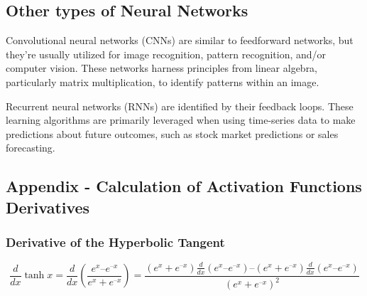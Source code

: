\documentclass[11pt]{article}
\begin{document}
    \hypertarget{other-types-of-neural-networks}{%
\subsection{Other types of Neural
Networks}\label{other-types-of-neural-networks}}

    Convolutional neural networks (CNNs) are similar to feedforward
networks, but they're usually utilized for image recognition, pattern
recognition, and/or computer vision. These networks harness principles
from linear algebra, particularly matrix multiplication, to identify
patterns within an image.

Recurrent neural networks (RNNs) are identified by their feedback loops.
These learning algorithms are primarily leveraged when using time-series
data to make predictions about future outcomes, such as stock market
predictions or sales forecasting.

    \hypertarget{appendix---calculation-of-activation-functions-derivatives}{%
\subsection{Appendix - Calculation of Activation Functions
Derivatives}\label{appendix---calculation-of-activation-functions-derivatives}}

\hypertarget{derivative-of-the-hyperbolic-tangent}{%
\subsubsection{Derivative of the Hyperbolic
Tangent}\label{derivative-of-the-hyperbolic-tangent}}

\[\frac{d}{{dx}}\tanh x = \frac{d}{{dx}}\left( {\frac{{{e^x} – {e^{ – x}}}}{{{e^x} + {e^{ – x}}}}} \right)
= \frac{{\left( {{e^x} + {e^{ – x}}} \right)\frac{d}{{dx}}\left( {{e^x} – {e^{ – x}}} \right) – \left( {{e^x} + {e^{ – x}}} \right)\frac{d}{{dx}}\left( {{e^x} – {e^{ – x}}} \right)}}{{{{\left( {{e^x} + {e^{ – x}}} \right)}^2}}}\]
\end{document}
